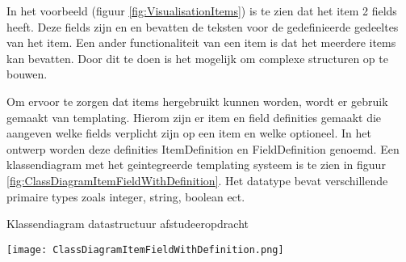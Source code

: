 \whitespace
In het voorbeeld (figuur \ref{fig:VisualisationItems}) is te zien dat het item  2 fields heeft.
Deze fields zijn  en  en bevatten de teksten voor de gedefinieerde gedeeltes van het item.
Een ander functionaliteit van een item is dat het meerdere items kan bevatten. 
Door dit te doen is het mogelijk om complexe structuren op te bouwen.

\whitespace
Om ervoor te zorgen dat items hergebruikt kunnen worden, wordt er gebruik gemaakt van templating.
Hierom zijn er item en field definities gemaakt die aangeven welke fields verplicht zijn op een item en welke optioneel.
In het ontwerp worden deze definities ItemDefinition en FieldDefinition genoemd.
Een klassendiagram met het geintegreerde templating systeem is te zien in figuur \ref{fig:ClassDiagramItemFieldWithDefinition}.
Het datatype  bevat verschillende primaire types zoals integer, string, boolean ect.

\whitespace[2]
\begin{graphic}
    \captionsetup{type=figure}
    \caption{Klassendiagram datastructuur afstudeeropdracht}
    \texttt{[image: ClassDiagramItemFieldWithDefinition.png]}
    \label{fig:ClassDiagramItemFieldWithDefinition}
\end{graphic}

